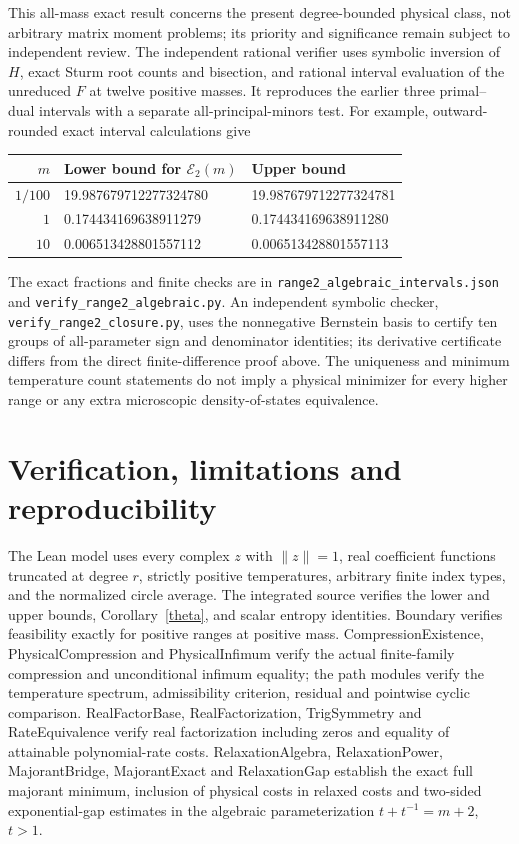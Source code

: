 \documentclass[11pt]{article}
\begin{document}
This all-mass exact result concerns the present degree-bounded physical class, not arbitrary matrix moment problems; its priority and significance remain subject to independent review. The independent rational verifier uses symbolic inversion of $H$, exact Sturm root counts and bisection, and rational interval evaluation of the unreduced $F$ at twelve positive masses. It reproduces the earlier three primal--dual intervals with a separate all-principal-minors test. For example, outward-rounded exact interval calculations give
\begin{center}
\begin{tabular}{@{}rll@{}}
\toprule
$m$ & Lower bound for $\mathcal E_2(m)$ & Upper bound \\\midrule
$1/100$ & 19.987679712277324780 & 19.987679712277324781\\
$1$ & 0.174434169638911279 & 0.174434169638911280\\
$10$ & 0.006513428801557112 & 0.006513428801557113\\\bottomrule
\end{tabular}
\end{center}
The exact fractions and finite checks are in \nolinkurl{range2_algebraic_intervals.json} and \nolinkurl{verify_range2_algebraic.py}. An independent symbolic checker, \nolinkurl{verify_range2_closure.py}, uses the nonnegative Bernstein basis to certify ten groups of all-parameter sign and denominator identities; its derivative certificate differs from the direct finite-difference proof above. The uniqueness and minimum temperature count statements do not imply a physical minimizer for every higher range or any extra microscopic density-of-states equivalence.

\section{Verification, limitations and reproducibility}
The Lean model uses every complex $z$ with $\|z\|=1$, real coefficient functions truncated at degree $r$, strictly positive temperatures, arbitrary finite index types, and the normalized circle average. The integrated source verifies the lower and upper bounds, Corollary~\ref{theta}, and scalar entropy identities. Boundary verifies feasibility exactly for positive ranges at positive mass. CompressionExistence, PhysicalCompression and PhysicalInfimum verify the actual finite-family compression and unconditional infimum equality; the path modules verify the temperature spectrum, admissibility criterion, residual and pointwise cyclic comparison. RealFactorBase, RealFactorization, TrigSymmetry and RateEquivalence verify real factorization including zeros and equality of attainable polynomial-rate costs. RelaxationAlgebra, RelaxationPower, MajorantBridge, MajorantExact and RelaxationGap establish the exact full majorant minimum, inclusion of physical costs in relaxed costs and two-sided exponential-gap estimates in the algebraic parameterization $t+t^{-1}=m+2$, $t>1$.
\end{document}
